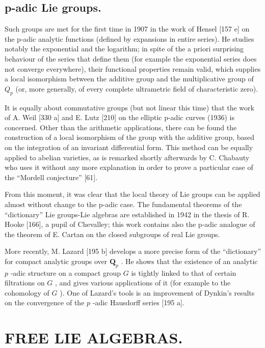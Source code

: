 \subsection{p-adic Lie groups.}

Such groups are met for the first time in 1907 in the work of Hensel {[}157 e{]} on the p-adic analytic functions (defined by expansions in entire series). He studies notably the exponential and the logarithm; in spite of the a priori surprising behaviour of the series that define them (for example the exponential series does not converge everywhere), their functional properties remain valid, which supplies a local isomorphism between the additive group and the multiplicative group of \(Q_{p}\) (or, more generally, of every complete ultrametric field of characteristic zero).

It is equally about commutative groups (but not linear this time) that the work of A. Weil {[}330 a{]} and E. Lutz {[}210{]} on the elliptic p-adic curves (1936) is concerned. Other than the arithmetic applications, there can be found the construction of a local isomorphism of the group with the additive group, based on the integration of an invariant differential form. This method can be equally applied to abelian varieties, as is remarked shortly afterwards by C. Chabauty who uses it without any more explanation in order to prove a particular case of the ``Mordell conjecture'' {[}61{]}.

From this moment, it was clear that the local theory of Lie groups can be applied almost without change to the p-adic case. The fundamental theorems of the ``dictionary'' Lie groups-Lie algebras are established in 1942 in the thesis of R. Hooke {[}166{]}, a pupil of Chevalley; this work contains also the p-adic analogue of the theorem of E. Cartan on the closed subgroups of real Lie groups.

More recently, M. Lazard {[}195 b{]} develops a more precise form of the ``dictionary'' for compact analytic groups over \(\mathbf{Q}_p\) . He shows that the existence of an analytic \(p\) -adic structure on a compact group \(G\) is tightly linked to that of certain filtrations on \(G\) , and gives various applications of it (for example to the cohomology of \(G\) ). One of Lazard's tools is an improvement of Dynkin's results on the convergence of the \(p\) -adic Hausdorff series {[}195 a{]}.

\section{FREE LIE ALGEBRAS.}

